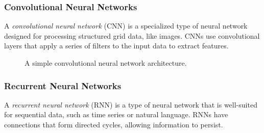 \documentclass{article}
\begin{document}
\subsubsection{Convolutional Neural Networks}

A \emph{convolutional neural network} (CNN) is a specialized type of neural network designed for processing structured grid data, like images. CNNs use convolutional layers that apply a series of filters to the input data to extract features.

\begin{figure}[H]
    \centering
    \caption{A simple convolutional neural network architecture.}
    \label{fig:cnn}
\end{figure}


\subsubsection{Recurrent Neural Networks}

A \emph{recurrent neural network} (RNN) is a type of neural network that is well-suited for sequential data, such as time series or natural language. RNNs have connections that form directed cycles, allowing information to persist.
\end{document}
